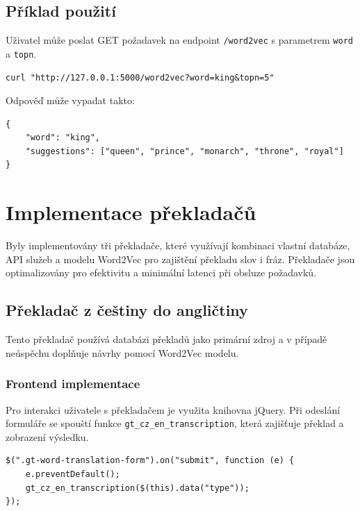\documentclass[czech, ba, kiv, he]{fasthesis}
\begin{document}
\subsection{Příklad použití}

Uživatel může poslat GET požadavek na endpoint \texttt{/word2vec} s parametrem \texttt{word} a \texttt{topn}.

\begin{lstlisting}[caption={GET požadavek}]
curl "http://127.0.0.1:5000/word2vec?word=king&topn=5"
\end{lstlisting}

Odpověď může vypadat takto:

\begin{lstlisting}[caption={API odpověď}]
{
    "word": "king",
    "suggestions": ["queen", "prince", "monarch", "throne", "royal"]
}
\end{lstlisting}


\section{Implementace překladačů}

Byly implementovány tři překladače, které využívají kombinaci vlastní databáze, API služeb a modelu Word2Vec pro zajištění překladu slov i fráz. Překladače jsou optimalizovány pro efektivitu a minimální latenci při obsluze požadavků.

\subsection{Překladač z češtiny do angličtiny}

Tento překladač používá databázi překladů jako primární zdroj a v případě neúspěchu doplňuje návrhy pomocí Word2Vec modelu.

\subsubsection*{Frontend implementace}
Pro interakci uživatele s překladačem je využita knihovna jQuery. Při odeslání formuláře se spouští funkce \texttt{gt\_cz\_en\_transcription}, která zajišťuje překlad a zobrazení výsledku.

\begin{lstlisting}[caption={funkce gt\_cz\_en\_transcription}]
$(".gt-word-translation-form").on("submit", function (e) {
    e.preventDefault();
    gt_cz_en_transcription($(this).data("type"));
});
\end{lstlisting}
\end{document}
